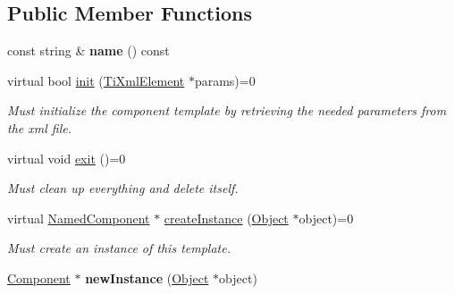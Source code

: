 \subsection*{\-Public \-Member \-Functions}
\begin{DoxyCompactItemize}
\item 
\hypertarget{classComponentTemplate_a8c3f747259d43ab2748ae117cd319a27}{
const string \& {\bfseries name} () const }
\label{d9/d38/classComponentTemplate_a8c3f747259d43ab2748ae117cd319a27}

\item 
\hypertarget{classComponentTemplate_ae120e04416b8cda673156ec589e368b2}{
virtual bool \hyperlink{classComponentTemplate_ae120e04416b8cda673156ec589e368b2}{init} (\hyperlink{classTiXmlElement}{\-Ti\-Xml\-Element} $\ast$params)=0}
\label{d9/d38/classComponentTemplate_ae120e04416b8cda673156ec589e368b2}

\begin{DoxyCompactList}\small\item\em \-Must initialize the component template by retrieving the needed parameters from the xml file. \end{DoxyCompactList}\item 
\hypertarget{classComponentTemplate_a7ac9c5fead9f257e8531c1ddeff07da0}{
virtual void \hyperlink{classComponentTemplate_a7ac9c5fead9f257e8531c1ddeff07da0}{exit} ()=0}
\label{d9/d38/classComponentTemplate_a7ac9c5fead9f257e8531c1ddeff07da0}

\begin{DoxyCompactList}\small\item\em \-Must clean up everything and delete itself. \end{DoxyCompactList}\item 
\hypertarget{classComponentTemplate_a3b0b62fd03f7f414644ce2bcec2e5cc1}{
virtual \hyperlink{classNamedComponent}{\-Named\-Component} $\ast$ \hyperlink{classComponentTemplate_a3b0b62fd03f7f414644ce2bcec2e5cc1}{create\-Instance} (\hyperlink{classObject}{\-Object} $\ast$object)=0}
\label{d9/d38/classComponentTemplate_a3b0b62fd03f7f414644ce2bcec2e5cc1}

\begin{DoxyCompactList}\small\item\em \-Must create an instance of this template. \end{DoxyCompactList}\item 
\hypertarget{classComponentTemplate_ac6c17ffc053508e841dbf65977543b15}{
\hyperlink{classComponent}{\-Component} $\ast$ {\bfseries new\-Instance} (\hyperlink{classObject}{\-Object} $\ast$object)}
\label{d9/d38/classComponentTemplate_ac6c17ffc053508e841dbf65977543b15}

\end{DoxyCompactItemize}
